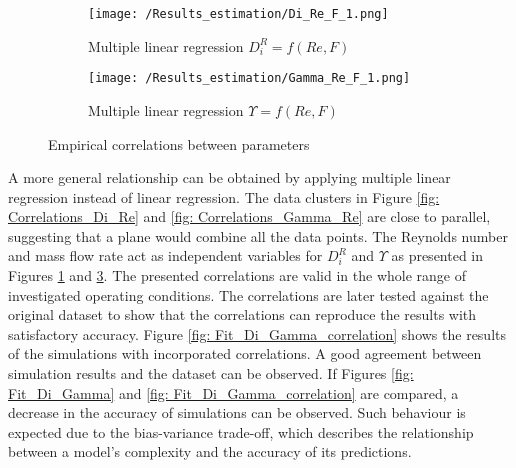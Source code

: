 \documentclass[../Supercritical_fluid_extraction_of_essential_oil_from_chamomile.tex]{subfiles}
\begin{document}
	\begin{figure}[!h]
		\centering
		\begin{subfigure}{0.9\columnwidth}
			\centering
			\texttt{[image: /Results\_estimation/Di\_Re\_F\_1.png]}
			\caption{Multiple linear regression $D_i^R = f(Re, F)$}
			\label{fig: Correlations_Di_Re_F}
		\end{subfigure}
		\hfill
		\begin{subfigure}{0.9\columnwidth}
			\centering
			\texttt{[image: /Results\_estimation/Gamma\_Re\_F\_1.png]}
			\caption{Multiple linear regression $\Upsilon = f(Re, F)$}
			\label{fig: Correlations_Gamma_Re_F}
		\end{subfigure}
		\caption{Empirical correlations between parameters}
	\end{figure}
	
	A more general relationship can be obtained by applying multiple linear regression instead of linear regression. The data clusters in Figure \ref{fig: Correlations_Di_Re} and \ref{fig: Correlations_Gamma_Re} are close to parallel, suggesting that a plane would combine all the data points. The Reynolds number and mass flow rate act as independent variables for $D_i^R$ and $\Upsilon$ as presented in Figures \ref{fig: Correlations_Di_Re_F} and \ref{fig: Correlations_Gamma_Re_F}. The presented correlations are valid in the whole range of investigated operating conditions. The correlations are later tested against the original dataset to show that the correlations can reproduce the results with satisfactory accuracy. Figure \ref{fig: Fit_Di_Gamma_correlation} shows the results of the simulations with incorporated correlations. A good agreement between simulation results and the dataset can be observed. If Figures \ref{fig: Fit_Di_Gamma} and \ref{fig: Fit_Di_Gamma_correlation} are compared, a decrease in the accuracy of simulations can be observed. Such behaviour is expected due to the bias-variance trade-off, which describes the relationship between a model's complexity and the accuracy of its predictions.
	
\end{document}
